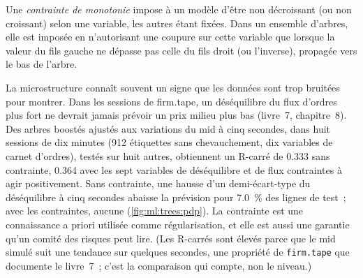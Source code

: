 \begin{omfigure}

\label{fig:ml:trees:early}
\end{omfigure}

\begin{definition}\label{def:ml:trees-and-boosting:monotone}
Une \emph{contrainte de monotonie} impose à un modèle d'être non décroissant (ou non croissant) selon une
variable, les autres étant fixées. Dans un ensemble d'arbres, elle est imposée en n'autorisant une coupure sur cette variable que lorsque la
valeur du fils gauche ne dépasse pas celle du fils droit (ou l'inverse), propagée vers le bas de l'arbre.
\end{definition}

La microstructure connaît souvent un signe que les données sont trop bruitées pour montrer. Dans les sessions de firm.tape, un déséquilibre du flux d'ordres plus fort
ne devrait jamais prévoir un prix milieu plus bas (livre~7, chapitre~8). Des arbres boostés ajustés aux variations du mid à cinq secondes, dans huit
sessions de dix minutes (912 étiquettes sans chevauchement, dix variables de carnet d'ordres), testés sur huit autres, obtiennent un R-carré de
0.333 sans contrainte, 0.364 avec les sept variables de déséquilibre et de flux contraintes à agir positivement. Sans contrainte, une
hausse d'un demi-écart-type du déséquilibre à cinq secondes abaisse la prévision pour 7.0~\% des lignes de test~; avec les
contraintes, aucune (\cref{fig:ml:trees:pdp}). La contrainte est une connaissance a priori utilisée comme régularisation, et elle est aussi
une garantie qu'un comité des risques peut lire. (Les R-carrés sont élevés parce que le mid simulé suit une tendance sur quelques secondes, une
propriété de \texttt{firm.tape} que documente le livre~7~; c'est la comparaison qui compte, non le niveau.)

